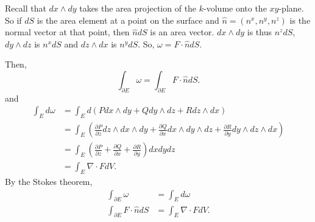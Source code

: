 \documentclass{article}
\theoremstyle{definition}
\theoremstyle{named}
\begin{document}
Recall that $dx \wedge dy$ takes the area projection of the $k$-volume onto the $xy$-plane. So if $dS$ is the area element at a point on the surface and $\hat{n} = (n^x, n^y, n^z)$ is the normal vector at that point, then $\hat{n} dS$ is an area vector. $dx \wedge dy$  is thus $n^z dS$, $dy \wedge dz$ is $n^x dS$ and $dz \wedge dx$ is $n^y dS$. So, $\omega = F\cdot \hat{n} dS$.

Then,
\[
    \int_{\partial E} \omega = \int_{\partial E} F\cdot \hat{n} dS.
\]  
and
\begin{align*}
    \int_{E} d\omega &= \int_{E} d(P dx \wedge dy + Q dy \wedge dz + R dz \wedge dx) \\
    &= \int_{E} \left( \frac{\partial P}{\partial z} dz \wedge dx \wedge dy + \frac{\partial Q}{\partial x} dx \wedge dy \wedge dz + \frac{\partial R}{\partial y} dy \wedge dz \wedge dx \right) \\
    &= \int_{E} \left( \frac{\partial P}{\partial z} + \frac{\partial Q}{\partial x} + \frac{\partial R}{\partial y} \right) dxdydz \\
    &= \int_{E} \nabla \cdot F dV.
\end{align*}
By the Stokes theorem,
\begin{align*}
    \int_{\partial E} \omega &= \int_{E} d\omega \\
    \int_{\partial E} F\cdot \hat{n} dS &= \int_{E} \nabla \cdot F dV.
\end{align*}
\end{document}
